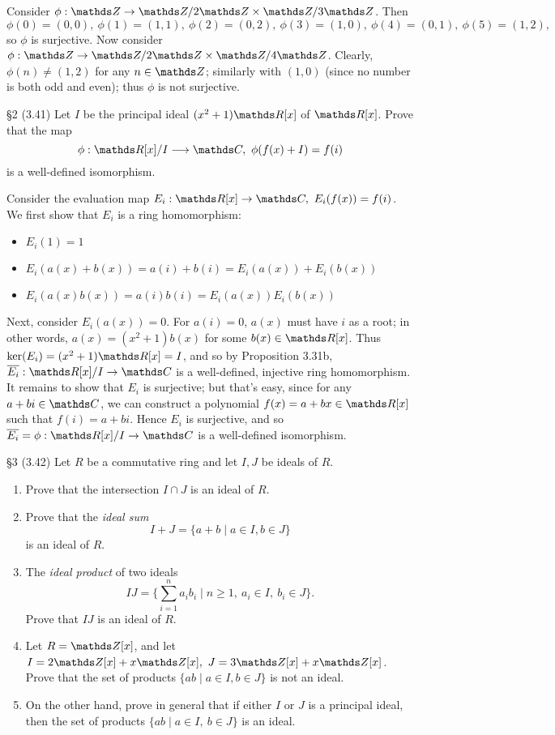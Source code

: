 \documentclass{homework}
\begin{document}
\begin{solution}
\begin{enumerate}[label=(\alph*)]
      Consider $\phi: \Z\to \Z / 2\Z \times  \Z / 3\Z$. Then \[
        \phi(0)=(0,0),\ \phi(1)=(1,1),\ \phi(2)=(0,2),\ \phi(3)=(1,0),\ \phi(4)=(0,1),\ \phi(5)=(1,2)
      ,\] so $\phi$ is surjective. Now consider $\phi: \Z \to \Z / 2\Z \times \Z/4\Z$. Clearly,
      $\phi(n)\neq (1,2)$ for any $n\in \Z$; similarly with $(1,0)$ (since no number is both odd and
      even); thus $\phi$ is not surjective.
  \end{enumerate}
\end{solution}

\begin{problem}{\S 2}
  (3.41) Let $I$ be the principal ideal $(x^2+1)\R[x]$ of $\R[x]$. Prove that the map \[
    \phi: \R[x] / I \longrightarrow \C,\ \phi(f(x)+I)=f(i)
  \] is a well-defined isomorphism.
\end{problem}
\begin{solution}
  Consider the evaluation map $E_i:\R[x]\to \C,\ E_i(f(x))=f(i)$. We first show that $E_i$ is a ring
  homomorphism:
  \begin{itemize}
    \item $E_i(1)=1$
    \item $E_i(a(x)+b(x))=a(i)+b(i)=E_i(a(x))+E_i(b(x))$
    \item $E_i(a(x)b(x))=a(i)b(i)=E_i(a(x))E_i(b(x))$
  \end{itemize}
  Next, consider $E_i(a(x))=0$. For $a(i)=0$, $a(x)$ must have $i$ as a root; in other words,
  $a(x)=(x^2+1)b(x)$ for some $b(x)\in \R[x]$. Thus $\ker(E_i)=(x^2+1)\R[x]=I$, and so by Proposition
  3.31b, $\overline{E_i}:\R[x] / I \to \C$ is a well-defined, injective ring homomorphism. It
  remains to show that $E_i$ is surjective; but that's easy, since for any $a+bi\in \C$, we can
  construct a polynomial $f(x)=a+bx\in \R[x]$ such that $f(i)=a+bi$. Hence $E_i$ is surjective, and
  so $\overline{E_i}=\phi:\R[x] / I \to \C$ is a well-defined isomorphism.
\end{solution}

\begin{problem}{\S 3}
  (3.42) Let $R$ be a commutative ring and let $I,J$ be ideals of $R$.
  \begin{enumerate}[label=(\alph*)]
    \item Prove that the intersection $I\cap J$ is an ideal of $R$.
    \item Prove that the \textit{ideal sum}  \[
        I+J=\{a+b\mid a\in I,b\in J\} 
      \] is an ideal of $R$.
    \item The \textit{ideal product} of two ideals \[
        IJ = \{\sum_{i=1}^{n} a_ib_i\mid n\ge 1,\ a_i\in I,\ b_i\in J\} 
      .\] Prove that $IJ$ is an ideal of $R$.
      \item Let $R=\Z[x]$, and let $I=2\Z[x]+x\Z[x],\ J=3\Z[x]+x\Z[x]$. Prove that the set of
        products $\{ab\mid a\in I,b\in J\} $ is not an ideal.
      \item On the other hand, prove in general that if either $I$ or $J$ is a principal ideal, then
        the set of products $\{ab\mid a\in I,\ b\in J\} $ is an ideal.
  \end{enumerate}
\end{problem}
\end{document}

